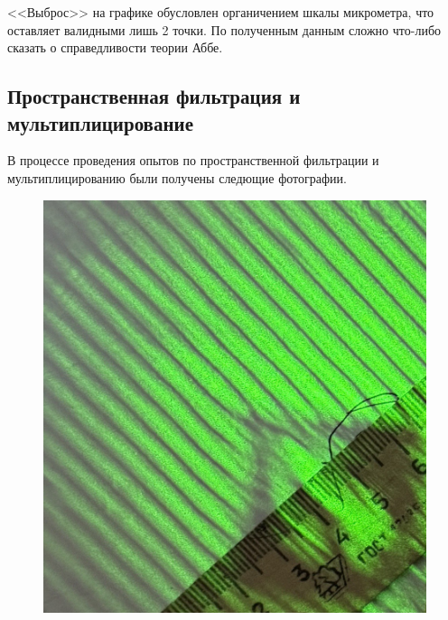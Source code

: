\documentclass[12pt, a4paper]{article}
\begin{document}
<<Выброс>> на графике обусловлен органичением шкалы микрометра, что оставляет
валидными лишь 2 точки. По полученным данным сложно что-либо сказать о
справедливости теории Аббе.

\subsection{Пространственная фильтрация и мультиплицирование}

В процессе проведения опытов по пространственной фильтрации и
мультиплицированию были получены следющие фотографии.
\begin{figure}[H]
    \begin{minipage}{0.2\textwidth}

    \end{minipage}
    \begin{minipage}{0.3\textwidth}
        \centering
        \includegraphics[height=\textwidth]{pics/diag.jpg}


\end{minipage}
\end{figure}
\end{document}
